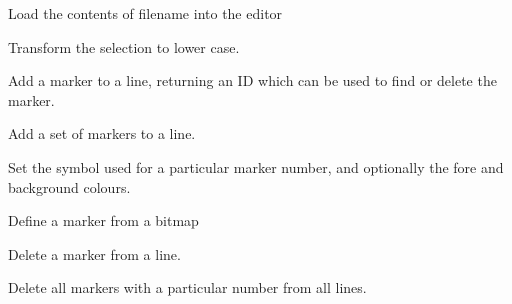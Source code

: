 
Load the contents of filename into the editor


\label{wxstyledtextctrllowercase}


Transform the selection to lower case.


\label{wxstyledtextctrlmarkeradd}


Add a marker to a line, returning an ID which can be used to find or delete the marker.


\label{wxstyledtextctrlmarkeraddset}


Add a set of markers to a line.


\label{wxstyledtextctrlmarkerdefine}


Set the symbol used for a particular marker number,
and optionally the fore and background colours.


\label{wxstyledtextctrlmarkerdefinebitmap}


Define a marker from a bitmap


\label{wxstyledtextctrlmarkerdelete}


Delete a marker from a line.


\label{wxstyledtextctrlmarkerdeleteall}


Delete all markers with a particular number from all lines.


\label{wxstyledtextctrlmarkerdeletehandle}

